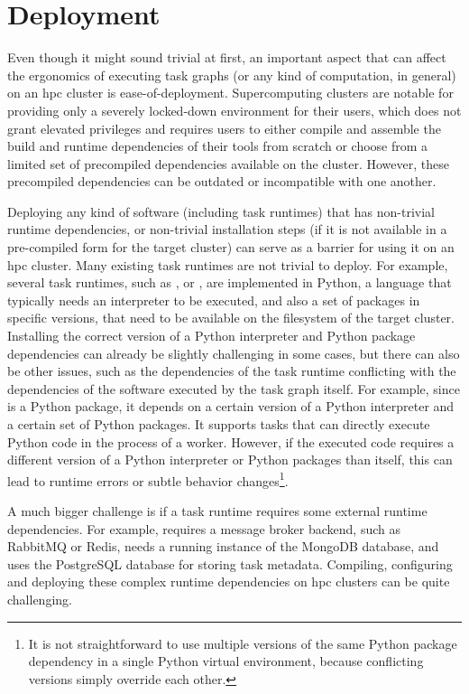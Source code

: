 \section{Deployment}
\label{challenge:deployment}
Even though it might sound trivial at first, an important aspect that can affect the ergonomics of
executing task graphs (or any kind of computation, in general) on an \gls{hpc}
cluster is ease-of-deployment. Supercomputing clusters are notable for providing only a severely
locked-down environment for their users, which does not grant elevated privileges and requires
users to either compile and assemble the build and runtime dependencies of their tools from
scratch or choose from a limited set of precompiled dependencies available on the cluster.
However, these precompiled dependencies can be outdated or incompatible with one another.

Deploying any kind of software (including task runtimes) that has non-trivial runtime dependencies,
or non-trivial installation steps (if it is not available in a pre-compiled form for the target
cluster) can serve as a barrier for using it on an \gls{hpc} cluster. Many
existing task runtimes are not trivial to deploy. For example, several task runtimes, such as
\dask{}, \snakemake{} or \pycompss{}, are
implemented in Python, a language that typically needs an interpreter to be executed, and also a
set of packages in specific versions, that need to be available on the filesystem of the target
cluster. Installing the correct version of a Python interpreter and Python package dependencies can
already be slightly challenging in some cases, but there can also be other issues, such as the
dependencies of the task runtime conflicting with the dependencies of the software executed by the
task graph itself. For example, since \dask{} is a Python package, it depends
on a certain version of a Python interpreter and a certain set of Python packages. It supports
tasks that can directly execute Python code in the process of a \dask{} worker.
However, if the executed code requires a different version of a Python interpreter or Python
packages than \dask{} itself, this can lead to runtime errors or subtle
behavior changes\footnote{It is not straightforward to use multiple versions of the same Python package dependency in a
single Python virtual environment, because conflicting versions simply override each other.}.

A much bigger challenge is if a task runtime requires some external runtime dependencies. For
example, \merlin{} requires a message broker backend, such as RabbitMQ or Redis, \fireworks{}
needs a running instance of the MongoDB database, and \balsam{} uses the PostgreSQL database for
storing task metadata. Compiling, configuring and deploying these complex runtime dependencies on
\gls{hpc} clusters can be quite challenging.

